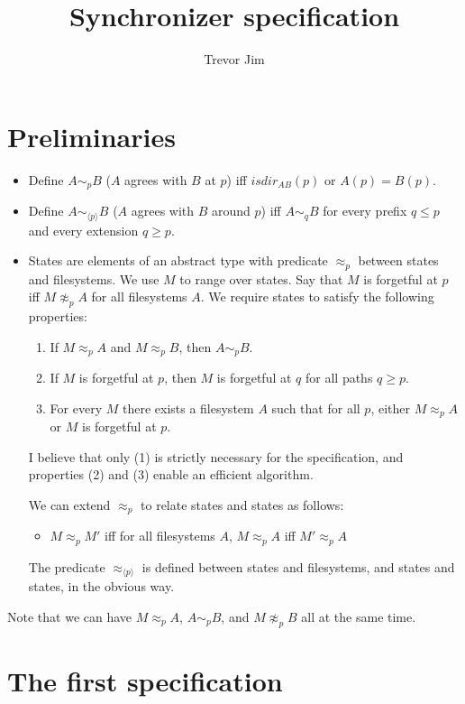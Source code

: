 \documentclass[12pt]{article}
\newcommand{\isdir}{\ensuremath{\mathit{isdir}}}
\newcommand{\agreeAt}[1]{\sim_{#1}}
\newcommand{\agreeAround}[1]{\sim_{\langle #1\rangle}}
\newcommand{\AgreeAt}[1]{\approx_{#1}}
\newcommand{\AgreeAround}[1]{\approx_{\langle #1\rangle}}
\begin{document}
\title{Synchronizer specification}
\author{Trevor Jim}
\maketitle


\section{Preliminaries}

\begin{itemize}
\item Define $A \agreeAt{p} B$ ($A$ agrees with $B$ at $p$) iff
  $\isdir_{AB}(p)$ or $A(p)=B(p)$.
\item Define $A \agreeAround{p} B$ ($A$ agrees with $B$ around $p$)
  iff $A \agreeAt{q} B$ for every prefix $q\leq p$
  and every extension $q\geq p$.
\item States are elements of an abstract type with predicate
  $\AgreeAt{p}$ between states and filesystems.  We use $M$ to range
  over states.  Say that $M$ is forgetful at $p$ iff
  $M\not\AgreeAt{p}A$ for all filesystems $A$.  We require states to
  satisfy the following properties:
  \begin{enumerate}
  \item If $M\AgreeAt{p}A$ and $M\AgreeAt{p}B$, then $A\agreeAt{p}B$.
  \item If $M$ is forgetful at $p$, then $M$ is forgetful at $q$ for
    all paths $q\geq p$.
  \item For every $M$ there exists a filesystem $A$ such that for all $p$,
    either $M\AgreeAt{p}A$ or $M$ is forgetful at $p$.
  \end{enumerate}
  I believe that only (1) is strictly necessary for the specification,
  and properties (2) and (3) enable an efficient algorithm.

  We can extend $\AgreeAt{p}$ to relate states and states as follows:
  \begin{itemize}
  \item $M\AgreeAt{p}M'$
    iff for all filesystems $A$, $M\AgreeAt{p}A$ iff $M'\AgreeAt{p}A$
  \end{itemize}
  The predicate $\AgreeAround{p}$ is defined between states and
  filesystems, and states and states, in the obvious way.
\end{itemize}

Note that we can have $M\AgreeAt{p}A$, $A\agreeAt{p}B$,
and $M\not\AgreeAt{p}B$ all at the same time.

\section{The first specification}
\end{document}
